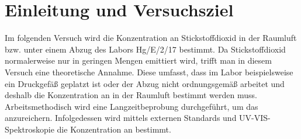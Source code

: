 \section{Einleitung und Versuchsziel}
\label{sec:aufgabenstellung}

Im folgenden Versuch wird die Konzentration an Stickstoffdioxid in der Raumluft bzw. unter einem Abzug des Labors Hg/E/2/17 bestimmt. Da Stickstoffdioxid normalerweise nur in geringen Mengen emittiert wird, trifft man in diesem Versuch eine theoretische Annahme. Diese umfasst, dass im Labor beispielsweise ein Druckgefäß geplatzt ist oder der Abzug nicht ordnungsgemäß arbeitet und deshalb die Konzentration an  in der Raumluft bestimmt werden muss.\\
Arbeitsmethodisch wird eine Langzeitbeprobung durchgeführt, um das  anzureichern. Infolgedessen wird mittels externen Standards und UV-VIS-Spektroskopie die Konzentration an  bestimmt.

